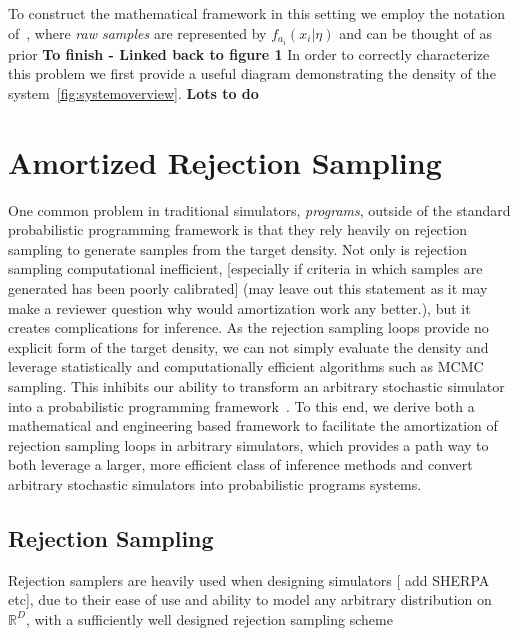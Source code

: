 \documentclass{article}
\begin{document}
To construct the mathematical framework in this setting we employ the notation of~\cite{rainforth2017automating}, 
where \emph{raw samples} are represented by $ f_{a_i}(x_i | \eta)$ and can be thought of as prior 
\textbf{To finish - Linked back to figure 1}
In order to correctly characterize this problem we first provide a useful diagram demonstrating 
the density of the system~\ref{fig:systemoverview}. \textbf{Lots to do}

 


%  


\section{Amortized Rejection Sampling}

One common problem in traditional simulators, \emph{programs}, outside of the standard probabilistic
programming framework is that they rely heavily on rejection sampling 
to generate samples from the target density. Not only is rejection sampling 
computational inefficient, [especially if criteria in which samples are generated
has been poorly calibrated] (may leave out this statement as it may make a reviewer
question why would amortization work any better.), but it creates complications for inference.
As the rejection sampling loops provide no explicit form of the target density,
we can not simply evaluate the density and leverage statistically and computationally
efficient algorithms such as MCMC sampling. This inhibits our ability to transform an arbitrary
stochastic simulator into a probabilistic programming framework~\cite{baydin2018efficient}. 
To this end, we derive both a mathematical and engineering based framework to facilitate 
the amortization of rejection sampling loops in arbitrary simulators, which provides a path
way to both leverage a larger, more efficient class of inference methods and convert arbitrary
stochastic simulators into probabilistic programs systems.

\subsection{Rejection Sampling}

Rejection samplers are heavily used when designing simulators [ add SHERPA etc], due to their ease of use and ability to model 
any arbitrary distribution on $\mathbb{R}^{D}$, with a sufficiently well designed rejection sampling scheme~\cite{MEYER20083408,martino2012improved,casella} 
\end{document}

